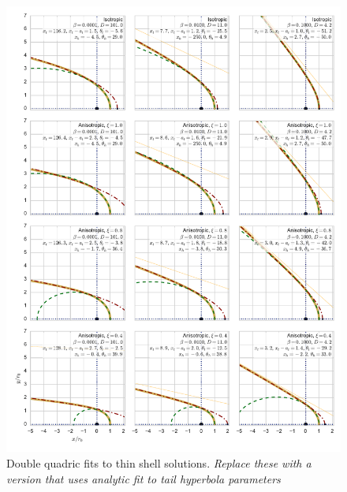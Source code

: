 \begin{figure}
  \centering
  \includegraphics[height=0.85\textheight]{figs/conic-head-tail-analytic}
  \caption{Double quadric fits to thin shell
    solutions. \textit{Replace these with a version that uses analytic
    fit to tail hyperbola parameters}}
  \label{fig:head-tail}
\end{figure}

